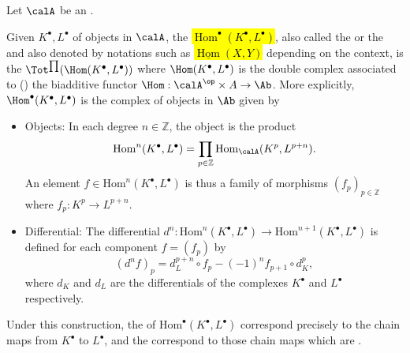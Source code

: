 \begin{definition} \label{definition:internal_hom_complex_of_chain_complexes_in_an_additive_category}
    Let $\calA$ be an . 

    Given  $K^\bullet, L^\bullet$ of objects in $\calA$, the  \hl{$\operatorname{Hom}^\bullet(K^\bullet, L^\bullet)$}, also called the  or the  and also denoted by notations such as \hl{$\underline{\operatorname{Hom}}(X,Y)$} depending on the context, is the  $\Tot^{\prod}(\Hom(K^\bullet, L^\bullet))$  where $\Hom(K^\bullet, L^\bullet)$ is the double complex associated to () the biadditive functor $\Hom: \calA^{\op} \times A \to \Ab$. More explicitly, $\Hom^\bullet(K^\bullet, L^\bullet)$ is the complex of objects in $\Ab$ given by

    \begin{itemize}
        \item Objects: In each degree $n \in \mathbb{Z}$, the object is the product
        $$ \mathrm{Hom}^n(K^\bullet, L^\bullet) = \prod_{p \in \mathbb{Z}} \mathrm{Hom}_{\calA}(K^p, L^{p+n}). $$
        An element $f \in \mathrm{Hom}^n(K^\bullet, L^\bullet)$ is thus a family of morphisms $(f_p)_{p \in \mathbb{Z}}$ where $f_p: K^p \to L^{p+n}$.
        \item Differential: The differential $d^n: \mathrm{Hom}^n(K^\bullet, L^\bullet) \to \mathrm{Hom}^{n+1}(K^\bullet, L^\bullet)$ is defined for each component $f = (f_p)$ by
        $$ (d^n f)_p = d_L^{p+n} \circ f_p - (-1)^n f_{p+1} \circ d_K^p, $$
        where $d_K$ and $d_L$ are the differentials of the complexes $K^\bullet$ and $L^\bullet$ respectively.
    \end{itemize}

    Under this construction, the  of $\mathrm{Hom}^\bullet(K^\bullet, L^\bullet)$ correspond precisely to the chain maps from $K^\bullet$ to $L^\bullet$, and the  correspond to those chain maps which are .


\end{definition}
